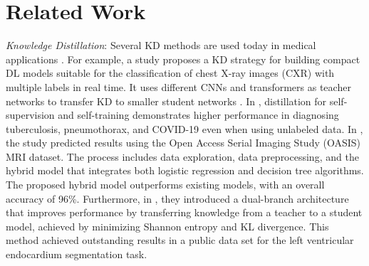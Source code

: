 \section{Related Work}
\label{sec:2}
\textit{Knowledge Distillation}: Several KD methods are used today in medical applications \cite{gou2021knowledge}. For example, a study proposes a KD strategy for building compact DL models suitable for the classification of chest X-ray images (CXR) with multiple labels in real time. It uses different CNNs and transformers as teacher networks to transfer KD to smaller student networks \cite{termritthikun2023explainable}. In \cite{park2022self}, distillation for self-supervision and self-training demonstrates higher performance in diagnosing tuberculosis, pneumothorax, and COVID-19 even when using unlabeled data. In \cite{patel2023logistic}, the study predicted results using the Open Access Serial Imaging Study (OASIS) MRI dataset. 
The process includes data exploration, data preprocessing, and the hybrid model that integrates both logistic regression and decision tree algorithms. The proposed hybrid model outperforms existing models, with an overall accuracy of 96\%. Furthermore, in \cite{liu2023segmentation}, 
they introduced a dual-branch architecture that improves performance by transferring knowledge from a teacher to a student model, achieved by minimizing Shannon entropy and KL divergence. This method achieved outstanding results in a public data set for the left ventricular endocardium segmentation task.

